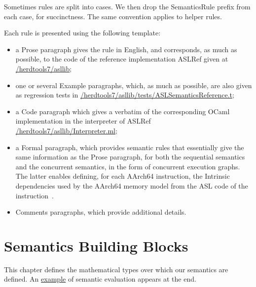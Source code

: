 \documentclass{book}
\begin{document}
Sometimes rules are split into cases.  We then drop the SemanticsRule prefix
from each case, for succinctness.  The same convention applies to helper rules.

Each rule is presented using the following template:
\begin{itemize}
\item a Prose paragraph gives the rule in English, and corresponds, as much as possible, to the code of the reference implementation ASLRef given at
 \href{https://github.com/herd/herdtools7//tree/master/asllib}{/herdtools7/asllib};

 \item one or several Example paragraphs, which, as much as possible, are also given as regression tests in
\href{https://github.com/herd/herdtools7//tree/master/asllib/tests/ASLSemanticsReference.t}{/herdtools7/asllib/tests/ASLSemanticsReference.t};

\ifcode
\item a Code paragraph which gives a verbatim of the corresponding OCaml implementation in the interpreter of ASLRef
\href{https://github.com/herd/herdtools7//tree/master/asllib/Interpreter.ml}{/herdtools7/asllib/Interpreter.ml};
\fi

\item a Formal paragraph, which provides semantic rules that essentially give the same information as the Prose paragraph, for both
the sequential semantics and the concurrent semantics, in the form of concurrent execution graphs.
The latter enables defining, for each AArch64 instruction,
the Intrinsic dependencies used by the AArch64 memory model from the ASL code of the instruction~\cite[B2.3.2]{ArmARM}.

\item Comments paragraphs, which provide additional details. %
\end{itemize}



\chapter{Semantics Building Blocks}
\label{chap:semanticsbuildingblocks}
This chapter defines the mathematical types over which our semantics are defined.
An \hyperlink{eval-example}{example} of semantic evaluation appears at the end.
\end{document}
